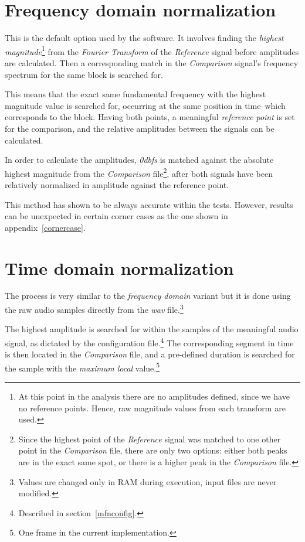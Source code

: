 \documentclass[10pt,a4paper]{report}
\newcommand{\ac}[1]{\textit{\mbox{\acrshort{#1}}}}
\newcommand{\db}[1]{\textit{\mbox{#1\acrshort{dbfs}}}}
\begin{document}
\begin{appendices}
\section{Frequency domain normalization}

This is the default option used by the software. It involves finding the \textit{highest magnitude}\footnote{At this point in the analysis there are no amplitudes defined, since we have no reference points. Hence, raw magnitude values from each transform are used.} from the \textit{Fourier Transform} of the \textit{Reference} signal before amplitudes are calculated. Then a corresponding match in the \textit{Comparison} signal's frequency spectrum for the same block is searched for. 

This means that the exact same fundamental frequency with the highest magnitude value is searched for, occurring at the same position in time--which corresponds to the block. Having both points, a meaningful \textit{reference point} is set for the comparison, and the relative amplitudes between the signals can be calculated.

In order to calculate the amplitudes, \db{0} is matched against the absolute highest magnitude from the \textit{Comparison} file\footnote{Since the highest point of the \textit{Reference} signal was matched to one other point in the \textit{Comparison} file, there are only two options: either both peaks are in the exact same spot, or there is a higher peak in the \textit{Comparison} file.}, after both signals have been relatively normalized in amplitude against the reference point.

This method has shown to be always accurate within the tests. However, results can be unexpected in certain corner cases as the one shown in appendix~\ref{cornercase}. 

\section{Time domain normalization}

The process is very similar to the \textit{frequency domain} variant but it is done using the raw audio samples directly from the \ac{wav} file.\footnote{Values are changed only in RAM during execution, input files are never modified.}

The highest amplitude is searched for within the samples of the meaningful audio signal, as dictated by the configuration file.\footnote{Described in section~\ref{mfnconfig}.} The corresponding segment in time is then located in the \textit{Comparison} file, and a pre-defined duration is searched for the sample with the \textit{maximum local} value.\footnote{One frame in the current implementation.}


\end{appendices}
\end{document}
